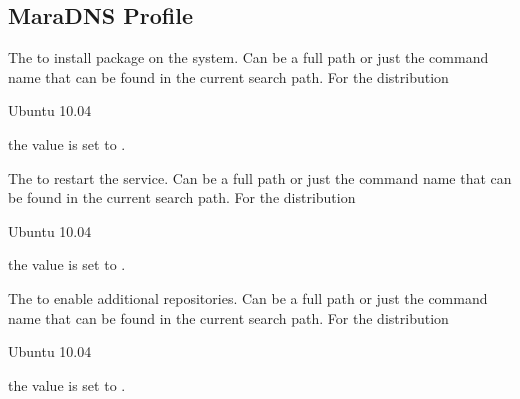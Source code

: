 \label{sec:maradns_profile}
\subsection{MaraDNS Profile}


The  to install package on the system. Can be a full path or
just the command name that can be found in the current search path. 
For the distribution
\begin{inparaitem}
\item[\TheDistribution{ubuntu}] Ubuntu 10.04
\end{inparaitem}
the value is set to .


The  to restart the service. Can be a full path or
just the command name that can be found in the current search path. 
For the distribution
\begin{inparaitem}
\item[\TheDistribution{ubuntu}] Ubuntu 10.04
\end{inparaitem}
the value is set to .


The  to enable additional repositories. Can be a full path or
just the command name that can be found in the current search path. 
For the distribution
\begin{inparaitem}
\item[\TheDistribution{ubuntu}] Ubuntu 10.04
\end{inparaitem}
the value is set to .



